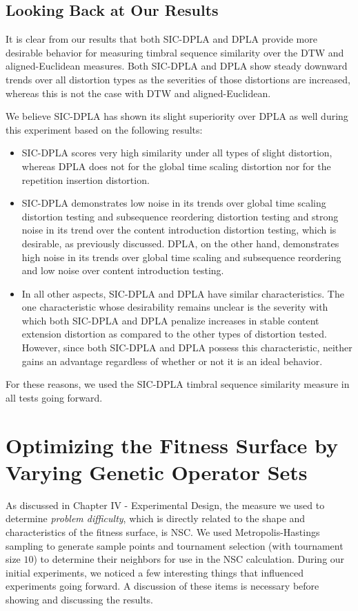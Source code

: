 \documentclass[12pt]{report} 	%
\numberwithin{figure}{chapter}
\numberwithin{table}{chapter}
\numberwithin{equation}{chapter}
\begin{document}
\begin{flushleft}
\subsection{Looking Back at Our Results}

It is clear from our results that both SIC-DPLA and DPLA provide more desirable behavior for measuring timbral sequence similarity over the DTW and aligned-Euclidean measures. Both SIC-DPLA and DPLA show steady downward trends over all distortion types as the severities of those distortions are increased, whereas this is not the case with DTW and aligned-Euclidean.

We believe SIC-DPLA has shown its slight superiority over DPLA as well during this experiment based on the following results:
\begin{itemize}
\item SIC-DPLA scores very high similarity under all types of slight distortion, whereas DPLA does not for the global time scaling distortion nor for the repetition insertion distortion. 
\item SIC-DPLA demonstrates low noise in its trends over global time scaling distortion testing and subsequence reordering distortion testing and strong noise in its trend over the content introduction distortion testing, which is desirable, as previously discussed. DPLA, on the other hand, demonstrates high noise in its trends over global time scaling and subsequence reordering and low noise over content introduction testing.
\item In all other aspects, SIC-DPLA and DPLA have similar characteristics. The one characteristic whose desirability remains unclear is the severity with which both SIC-DPLA and DPLA penalize increases in stable content extension distortion as compared to the other types of distortion tested. However, since both SIC-DPLA and DPLA possess this characteristic, neither gains an advantage regardless of whether or not it is an ideal behavior.
\end{itemize}

For these reasons, we used the SIC-DPLA timbral sequence similarity measure in all tests going forward.

\section{Optimizing the Fitness Surface by Varying Genetic Operator Sets}
As discussed in Chapter IV - Experimental Design, the measure we used to determine \textit{problem difficulty}, which is directly related to the shape and characteristics of the fitness surface, is NSC. We used Metropolis-Hastings sampling to generate sample points and tournament selection (with tournament size $10$) to determine their neighbors for use in the NSC calculation. During our initial experiments, we noticed a few interesting things that influenced experiments going forward. A discussion of these items is necessary before showing and discussing the results.

\end{flushleft}
\end{document}

